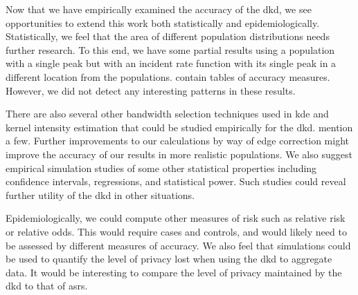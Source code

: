 

Now that we have empirically examined the accuracy of the \gls{dkd},
we see opportunities to extend this work both statistically and epidemiologically.
Statistically,
we feel that the area of different population distributions needs further research.
To this end,
we have some partial results using a population with a single peak
but with an incident rate function with its single peak in a different location from the populations.
 contain tables of accuracy measures.
However,
we did not detect any interesting patterns in these results.

There are also several other bandwidth selection techniques used in \gls{kde}
and \gls{kernel intensity estimation} that could be studied empirically for the \gls{dkd}.
\citet{silverman1986density,wand1994kernel} mention a few.
Further improvements to our calculations by way of edge correction might improve the accuracy of our results in more realistic populations.
We also suggest empirical simulation studies of some other statistical properties  
including confidence intervals, regressions, and statistical power.
Such studies could reveal further utility of the \gls{dkd} in other situations.

Epidemiologically,
we could compute other measures of risk such as relative risk or relative odds.
This would require cases and controls,
and would likely need to be assessed by different measures of accuracy.
We also feel that simulations could be used to quantify the level of privacy lost when using the \gls{dkd} to aggregate data.
It would be interesting to compare the level of privacy maintained by the \gls{dkd} to that of \glspl{asr}.
